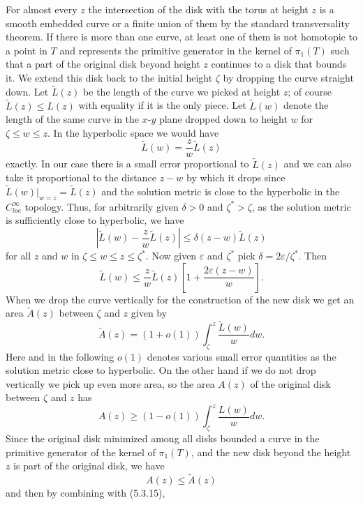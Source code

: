 For almost every $z$ the intersection of the disk with the torus
at height $z$ is a smooth embedded curve or a finite union of them
by the standard transversality theorem. If there is more than one
curve, at least one of them is not homotopic to a point in $T$ and
represents the primitive generator in the kernel of $\pi_1(T)$
such that a part of the original disk beyond height $z$ continues
to a disk that bounds it. We extend this disk back to the initial
height $\zeta$ by dropping the curve straight down. Let
$\tilde{L}(z)$ be the length of the curve we picked at height $z$;
of course $\tilde{L}(z)\leq L(z)$ with equality if it is the only
piece. Let $\tilde{L}(w)$ denote the length of the same curve in
the $x$-$y$ plane dropped down to height $w$ for $\zeta\leq w \leq
z$. In the hyperbolic space we would have
$$
\tilde{L}(w)=\frac{z}{w}\tilde{L}(z)
$$
exactly. In our case there is a small error proportional to
$\tilde{L}(z)$ and we can also take it proportional to the
distance $z-w$ by which it drops since
$\tilde{L}(w)|_{w=z}=\tilde{L}(z)$ and the solution metric is
close to the hyperbolic in the $C_{loc}^{\infty}$ topology. Thus,
for arbitrarily given $\delta>0$ and $\zeta^{\ast}>\zeta$, as the
solution metric is sufficiently close to hyperbolic, we have
$$
|\tilde{L}(w)-\frac{z}{w}\tilde{L}(z)|\leq \delta(z-w)\tilde{L}(z)
$$
for all $z$ and $w$ in $\zeta\leq w\leq z\leq {\zeta}^{\ast}$. Now
given $\varepsilon$ and ${\zeta}^{\ast}$ pick
$\delta=2\varepsilon/\zeta^{\ast} $. Then \begin{equation} \tilde{L}(w)\leq
\frac{z}{w}\tilde{L}(z)\left[1+\frac{2\varepsilon(z-w)}{w}\right].
\end{equation} When we drop the curve vertically for the construction of the
new disk we get an area $\tilde{A}(z)$ between $\zeta$ and $z$
given by
$$
\tilde{A}(z)=(1+o(1))\int_{\zeta}^{z} \frac{\tilde{L}(w)}{w}dw.
$$
Here and in the following $o(1)$ denotes various small error
quantities as the solution metric close to hyperbolic. On the
other hand if we do not drop vertically we pick up even more area,
so the area $A(z)$ of the original disk between $\zeta$ and $z$
has \begin{equation} A(z)\geq (1-o(1))\int_{\zeta}^{z} \frac{L(w)}{w} dw.
\end{equation} Since the original disk minimized among all disks bounded a
curve in the primitive generator of the kernel of $\pi_1(T)$, and
the new disk beyond the height $z$ is part of the original disk,
we have
$$
A(z)\leq \tilde{A}(z)
$$
and then by combining with (5.3.15),
